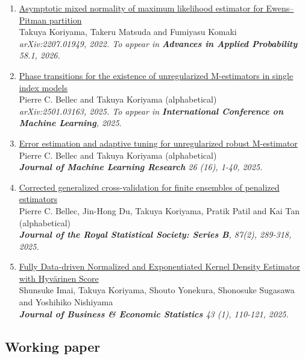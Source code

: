 \documentclass[10pt]{amsart}
\begin{document}
\begin{enumerate}
  \item \href{https://arxiv.org/abs/2207.01949}
  {Asymptotic mixed normality of maximum likelihood estimator for Ewens--Pitman partition}\\
  Takuya Koriyama, Takeru Matsuda and Fumiyasu Komaki\\
  \textit{arXiv:2207.01949, 2022. To appear in \textbf{Advances in Applied Probability} 58.1, 2026.}

  \item \href{https://arxiv.org/abs/2501.03163}{Phase transitions for the existence of unregularized M-estimators in single index models} \\
  Pierre C. Bellec and Takuya Koriyama (alphabetical)\\
  \textit{arXiv:2501.03163, 2025. To appear in \textbf{International Conference on Machine Learning}, 2025}.

  \item \href{https://jmlr.org/papers/v26/24-0060.html}{Error estimation and adaptive tuning for unregularized robust M-estimator}\\
  Pierre C. Bellec and Takuya Koriyama (alphabetical)\\
  \textit{\textbf{Journal of Machine Learning Research}  26 (16), 1-40, 2025.} 

  \item \href{https://doi.org/10.1093/jrsssb/qkae092}{Corrected generalized cross-validation for finite ensembles of penalized estimators}\\
  Pierre C. Bellec, Jin-Hong Du, Takuya Koriyama, Pratik Patil and Kai Tan (alphabetical)\\
  \textit{\textbf{Journal of the Royal Statistical Society: Series B}, 87(2), 289-318, 2025.} 

  \item  \href{https://www.tandfonline.com/doi/full/10.1080/07350015.2024.2326149?casa_token=_YOXJFqGXa0AAAAA%3AZCueJ9QbEp0N1Yvh8Bm0ieEefDcQECfZyzYWfPd2KTI_yxy9l7rt0cja6c5I4cyVJuAT7q2sfTzo}{Fully Data-driven Normalized and Exponentiated Kernel Density Estimator with Hyvärinen Score}\\
  Shunsuke Imai, Takuya Koriyama, Shouto Yonekura, Shonosuke Sugasawa and Yoshihiko Nishiyama\\
  \textit{\textbf{Journal of Business \& Economic Statistics} 43 (1), 110-121, 2025.
  }
\end{enumerate}

\subsection*{Working paper}
\end{document}
